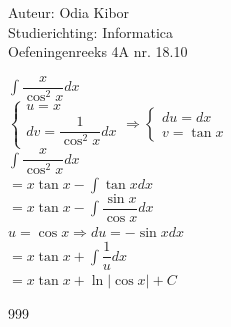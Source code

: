 \documentclass[a4paper]{article}
\begin{document}
  
\noindent \large Auteur: Odia Kibor \\
\noindent \large Studierichting: Informatica\\
\noindent \large Oefeningenreeks 4A nr. 18.10\\

\medskip

\normalsize


$\displaystyle\int  \dfrac{x}{\cos^2x}dx$\\

$\left\{
\begin{array}{l}
	u = x \\ 
	dv = \dfrac{1}{\cos^2x}dx
\end{array}\right.
\Rightarrow 
\left\{
\begin{array}{l}
	du = dx\\
 	v = \tan x
\end{array}
\right.$\\

$\displaystyle\int  \dfrac{x}{\cos^2x}dx$\\

$= x \tan x - \displaystyle\int \tan x dx$ \\

$= x \tan x - \displaystyle\int \dfrac{\sin x}{\cos x} dx$ \\

$u = \cos x \Rightarrow du = - \sin xdx$\\

$= x \tan x + \displaystyle\int \dfrac{1}{u} dx$ \\

$= x \tan x + \ln |\cos x| + C$ \\



















\begin{thebibliography}{999}
\end{thebibliography}
\end{document}
